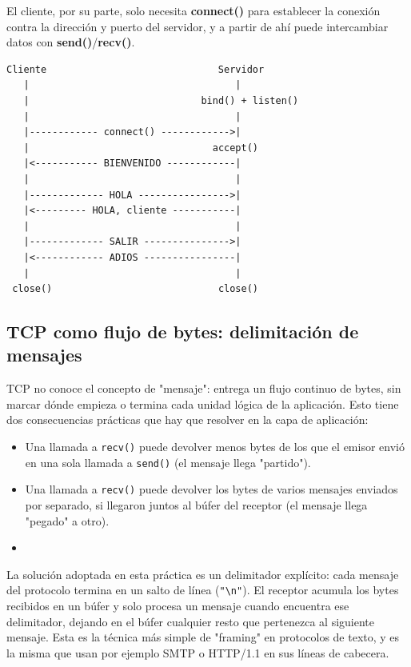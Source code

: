 \documentclass[12pt,a4paper]{article}
\begin{document}
El cliente, por su parte, solo necesita \textbf{connect()} para establecer la conexión contra la dirección y puerto del servidor, y a partir de ahí puede intercambiar datos con \textbf{send()}/\textbf{recv()}.

\begin{verbatim}
Cliente                              Servidor
   |                                    |
   |                              bind() + listen()
   |                                    |
   |------------ connect() ------------>|
   |                                accept()
   |<----------- BIENVENIDO ------------|
   |                                    |
   |------------- HOLA ---------------->|
   |<--------- HOLA, cliente -----------|
   |                                    |
   |------------- SALIR --------------->|
   |<------------ ADIOS ----------------|
   |                                    |
 close()                             close()
\end{verbatim}

\subsection{TCP como flujo de bytes: delimitación de mensajes}

TCP no conoce el concepto de "mensaje": entrega un flujo continuo de bytes, sin marcar dónde empieza o termina cada unidad lógica de la aplicación. Esto tiene dos consecuencias prácticas que hay que resolver en la capa de aplicación:

\begin{itemize}
    \item Una llamada a \texttt{recv()} puede devolver menos bytes de los que el emisor envió en una sola llamada a \texttt{send()} (el mensaje llega "partido").
    \item Una llamada a \texttt{recv()} puede devolver los bytes de varios mensajes enviados por separado, si llegaron juntos al búfer del receptor (el mensaje llega "pegado" a otro).
    \item[]
\end{itemize}

La solución adoptada en esta práctica es un delimitador explícito: cada mensaje del protocolo termina en un salto de línea (\texttt{"\textbackslash n"}). El receptor acumula los bytes recibidos en un búfer y solo procesa un mensaje cuando encuentra ese delimitador, dejando en el búfer cualquier resto que pertenezca al siguiente mensaje. Esta es la técnica más simple de "framing" en protocolos de texto, y es la misma que usan por ejemplo SMTP o HTTP/1.1 en sus líneas de cabecera.
\end{document}
